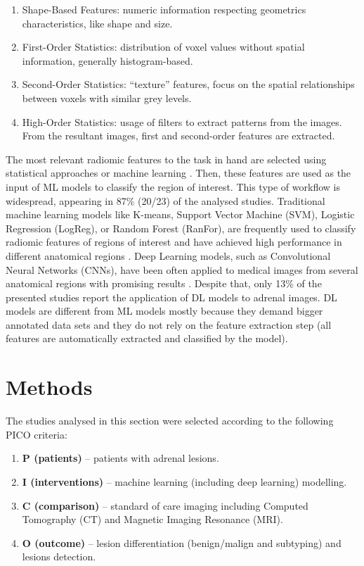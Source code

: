 \documentclass[11pt]{article}
\begin{document}
\begin{enumerate}
    \item Shape-Based Features: numeric information respecting geometrics characteristics, like shape and size.
    \item First-Order Statistics: distribution of voxel values without spatial information, generally histogram-based.
    \item Second-Order Statistics: “texture” features, focus on the spatial relationships between voxels with similar grey levels.
    \item High-Order Statistics: usage of filters to extract patterns from the images. From the resultant images, first and second-order features are extracted.
\end{enumerate}

The most relevant radiomic features to the task in hand are selected using
statistical approaches or machine learning \cite{Zhang2022}. Then, these
features are used as the input of ML models to classify the region of interest.
This type of workflow is widespread, appearing in 87\% (20/23) of the analysed
studies. Traditional machine learning models like K-means, Support Vector
Machine (SVM), Logistic Regression (LogReg), or Random Forest (RanFor), are
frequently used to classify radiomic features of regions of interest and have
achieved high performance in different anatomical regions \cite{Zhang2022,
    Wagner2021}. Deep Learning models, such as Convolutional Neural Networks
(CNNs), have been often applied to medical images from several anatomical
regions with promising results \cite{Anaya-Isaza2021}. Despite that, only 13\%
of the presented studies report the application of DL models to
adrenal images. DL models are different from ML models mostly because they
demand bigger annotated data sets and they do not rely on the feature extraction
step (all features are automatically extracted and classified by the model).

\section{Methods}

The studies analysed in this section were selected according to the following PICO criteria:

\begin{enumerate}
    \item[] \textbf{P (patients) }– patients with adrenal lesions.
    \item[] \textbf{I (interventions) }– machine learning (including deep learning) modelling.
    \item[] \textbf{C (comparison) }– standard of care imaging including Computed Tomography (CT) and Magnetic Imaging Resonance (MRI).
    \item[] \textbf{O (outcome) }– lesion differentiation (benign/malign and subtyping) and lesions detection.
\end{enumerate}
\end{document}

